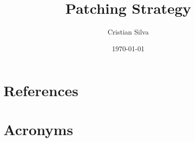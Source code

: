 \documentclass[PMO,authoryear,lsstdraft,toc]{lsstdoc}
\title{Patching Strategy}
\author{%
Cristian Silva
}
\date{\today}
\begin{document}
\maketitle




\appendix
\section{References} \label{sec:bib}
\renewcommand{\refname}{} %


\section{Acronyms} \label{sec:acronyms}

\end{document}
